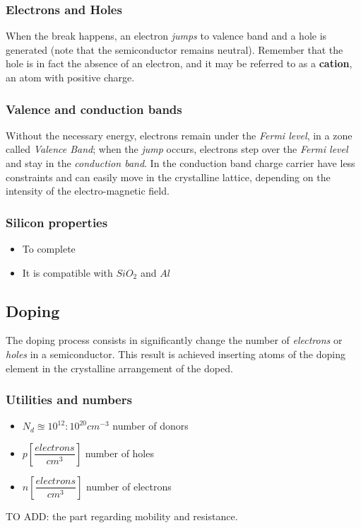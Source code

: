 \documentclass[12pt]{article}
\newcommand{\B}{\textbf}
\newcommand{\I}{\textit}
\newcommand{\bite}{\begin{itemize}} %
\newcommand{\fite}{\end{itemize}}   %
\begin{document}
\subsubsection{Electrons and Holes}
When the break happens, an electron \I{jumps} to valence band and a hole is generated (note that the semiconductor remains neutral). Remember that the hole is in fact the absence of an electron, and it may be referred to as a \B{cation}, an atom with positive charge. 
\subsubsection{Valence and conduction bands}
Without the necessary energy, electrons remain under the \I{Fermi level}, in a zone called \I{Valence Band}; when the \I{jump} occurs, electrons step over the \I{Fermi level} and stay in the \I{conduction band}. In the conduction band charge carrier have less constraints and can easily move in the crystalline lattice, depending on the intensity of the electro-magnetic field.
\subsubsection{Silicon properties}
\bite
	\item To complete 
	\item It is compatible with $SiO_2$ and $Al$
\fite

\subsection{Doping}
The doping process consists in significantly change the number of \textit{electrons }or \textit{holes} in a semiconductor.
This result is achieved inserting atoms of the doping element in the crystalline arrangement of the doped.
\subsubsection{Utilities and numbers}
\begin{itemize}
	\item $N_{d} \approxeq 10^{12} : 10^{20} cm^{-3}$ number of donors
	\item $p 	[\dfrac{electrons}{cm^3}]$ number of holes 
	\item $n 	[\dfrac{electrons}{cm^3}]$ number of electrons 
\end{itemize}

TO ADD: the part regarding mobility and resistance.
\end{document}
